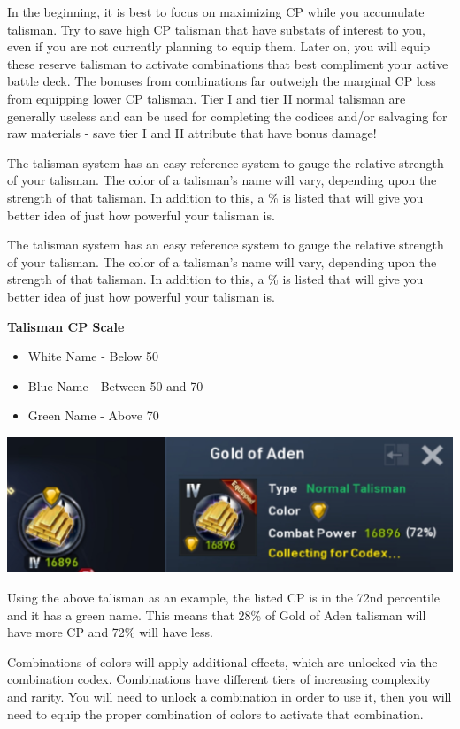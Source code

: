 \documentclass[]{article}
\begin{document}
In the beginning, it is best to focus on maximizing CP while you accumulate talisman.
Try to save high CP talisman that have substats of interest to you, even if you are not currently planning to equip them.
Later on, you will equip these reserve talisman to activate combinations that best compliment your active battle deck.
The bonuses from combinations far outweigh the marginal CP loss from equipping lower CP talisman.
Tier I and tier II normal talisman are generally useless and can be used for completing the codices and/or salvaging for raw materials - save tier I and II attribute that have bonus damage!

The talisman system has an easy reference system to gauge the relative strength of your talisman.
The color of a talisman's name will vary, depending upon the strength of that talisman.
In addition to this, a \% is listed that will give you better idea of just how powerful your talisman is.

The talisman system has an easy reference system to gauge the relative strength of your talisman.
The color of a talisman's name will vary, depending upon the strength of that talisman.
In addition to this, a \% is listed that will give you better idea of just how powerful your talisman is.

\begin{center}
	\textbf{Talisman CP Scale}
\end{center}
\begin{itemize}
	\item White Name - Below 50
	\item Blue Name - Between 50 and 70
	\item Green Name - Above 70
\end{itemize}
\begin{center}
	\includegraphics[scale=0.5]{talis3}
\end{center}
Using the above talisman as an example, the listed CP is in the 72nd percentile and it has a green name.
This means that 28\% of Gold of Aden talisman will have more CP and 72\% will have less.

Combinations of colors will apply additional effects, which are unlocked via the combination codex.
Combinations have different tiers of increasing complexity and rarity.
You will need to unlock a combination in order to use it, then you will need to equip the proper combination of colors to activate that combination.
\end{document}
